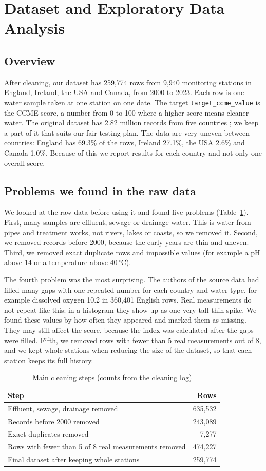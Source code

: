 \documentclass[11pt,a4paper]{article}
\begin{document}
\section{Dataset and Exploratory Data Analysis}\label{sec:eda}
\subsection{Overview}
After cleaning, our dataset has 259,774 rows from 9,940 monitoring stations in England, Ireland, the USA and Canada, from 2000 to 2023. Each row is one water sample taken at one station on one date. The target \texttt{target\_ccme\_value} is the CCME score, a number from 0 to 100 where a higher score means cleaner water. The original dataset has 2.82 million records from five countries \cite{karim2025}; we keep a part of it that suits our fair-testing plan. The data are very uneven between countries: England has 69.3\% of the rows, Ireland 27.1\%, the USA 2.6\% and Canada 1.0\%. Because of this we report results for each country and not only one overall score.

\subsection{Problems we found in the raw data}
We looked at the raw data before using it and found five problems (Table~\ref{tab:clean}). First, many samples are effluent, sewage or drainage water. This is water from pipes and treatment works, not rivers, lakes or coasts, so we removed it. Second, we removed records before 2000, because the early years are thin and uneven. Third, we removed exact duplicate rows and impossible values (for example a pH above 14 or a temperature above 40\,$^\circ$C).

The fourth problem was the most surprising. The authors of the source data had filled many gaps with one repeated number for each country and water type, for example dissolved oxygen 10.2 in 360,401 English rows. Real measurements do not repeat like this: in a histogram they show up as one very tall thin spike. We found these values by how often they appeared and marked them as missing. They may still affect the score, because the index was calculated after the gaps were filled. Fifth, we removed rows with fewer than 5 real measurements out of 8, and we kept whole stations when reducing the size of the dataset, so that each station keeps its full history.
\begin{table}[H]\centering\small\caption{Main cleaning steps (counts from the cleaning log)}\label{tab:clean}
\begin{tabular}{p{4.3in}r}\toprule Step & Rows\\\midrule
Effluent, sewage, drainage removed & 635,532\\
Records before 2000 removed & 243,089\\
Exact duplicates removed & 7,277\\
Rows with fewer than 5 of 8 real measurements removed & 474,227\\
Final dataset after keeping whole stations & 259,774\\\bottomrule\end{tabular}\end{table}
\end{document}
